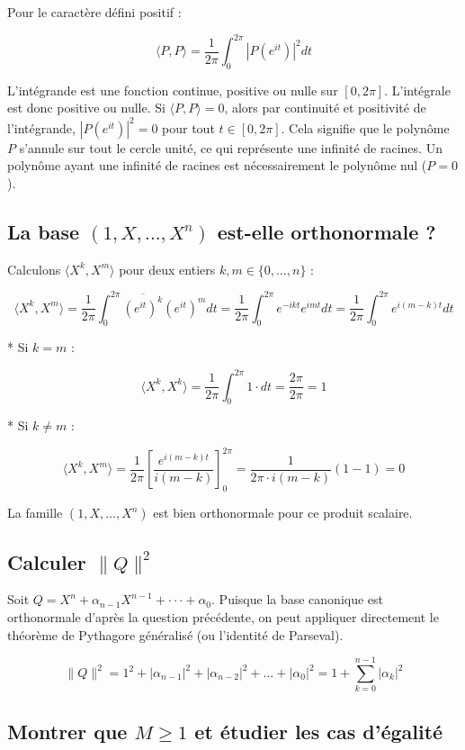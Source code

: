 \documentclass[french]{yLectureNote}
\begin{document}
Pour le caractère défini positif :


$$\langle P,P\rangle = \frac{1}{2\pi}\int_{0}^{2\pi} |P(e^{it})|^2 dt$$


L'intégrande est une fonction continue, positive ou nulle sur $[0, 2\pi]$. L'intégrale est donc positive ou nulle.
Si $\langle P,P\rangle = 0$, alors par continuité et positivité de l'intégrande, $|P(e^{it})|^2 = 0$ pour tout $t \in [0, 2\pi]$.
Cela signifie que le polynôme $P$ s'annule sur tout le cercle unité, ce qui représente une infinité de racines. Un polynôme ayant une infinité de racines est nécessairement le polynôme nul ($P = 0$).

\subsection{La base $(1,X,...,X^{n})$ est-elle orthonormale ?}

Calculons $\langle X^k, X^m \rangle$ pour deux entiers $k, m \in \{0, \dots, n\}$ :


$$\langle X^k, X^m \rangle = \frac{1}{2\pi}\int_{0}^{2\pi} \overline{(e^{it})^k} (e^{it})^m dt = \frac{1}{2\pi}\int_{0}^{2\pi} e^{-ikt} e^{imt} dt = \frac{1}{2\pi}\int_{0}^{2\pi} e^{i(m-k)t} dt$$

* Si $k = m$ :

$$\langle X^k, X^k \rangle = \frac{1}{2\pi}\int_{0}^{2\pi} 1 \cdot dt = \frac{2\pi}{2\pi} = 1$$


* Si $k \neq m$ :

$$\langle X^k, X^m \rangle = \frac{1}{2\pi} \left[ \frac{e^{i(m-k)t}}{i(m-k)} \right]_0^{2\pi} = \frac{1}{2\pi \cdot i(m-k)} (1 - 1) = 0$$




La famille $(1, X, \dots, X^n)$ est bien orthonormale pour ce produit scalaire.

\subsection{Calculer $\|Q\|^{2}$}

Soit $Q = X^{n}+\alpha_{n-1}X^{n-1}+\cdot\cdot\cdot+\alpha_{0}$.
Puisque la base canonique est orthonormale d'après la question précédente, on peut appliquer directement le théorème de Pythagore généralisé (ou l'identité de Parseval).

$$\|Q\|^2 = 1^2 + |\alpha_{n-1}|^2 + |\alpha_{n-2}|^2 + \dots + |\alpha_{0}|^2 = 1 + \sum_{k=0}^{n-1} |\alpha_k|^2$$

 \subsection{Montrer que $M \ge 1$ et étudier les cas d'égalité}
\end{document}
